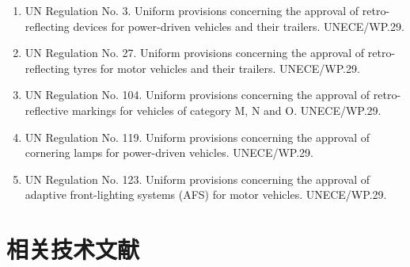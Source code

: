 \begin{enumerate}[leftmargin=2em]
    \item UN Regulation No. 3. Uniform provisions concerning the approval of retro-reflecting devices for power-driven vehicles and their trailers. UNECE/WP.29.

    \item UN Regulation No. 27. Uniform provisions concerning the approval of retro-reflecting tyres for motor vehicles and their trailers. UNECE/WP.29.

    \item UN Regulation No. 104. Uniform provisions concerning the approval of retro-reflective markings for vehicles of category M, N and O. UNECE/WP.29.

    \item UN Regulation No. 119. Uniform provisions concerning the approval of cornering lamps for power-driven vehicles. UNECE/WP.29.

    \item UN Regulation No. 123. Uniform provisions concerning the approval of adaptive front-lighting systems (AFS) for motor vehicles. UNECE/WP.29.
\end{enumerate}

\section{相关技术文献}

